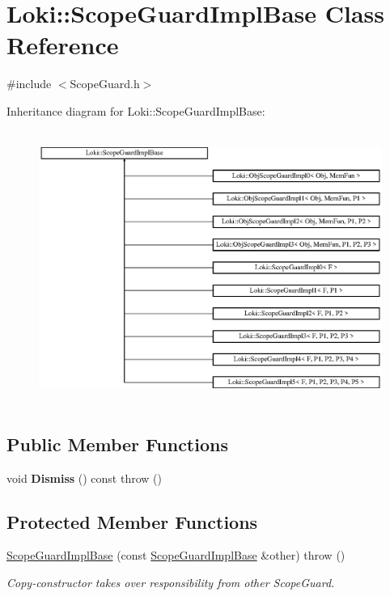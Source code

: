 \hypertarget{classLoki_1_1ScopeGuardImplBase}{}\section{Loki\+:\+:Scope\+Guard\+Impl\+Base Class Reference}
\label{classLoki_1_1ScopeGuardImplBase}


{\ttfamily \#include $<$Scope\+Guard.\+h$>$}

Inheritance diagram for Loki\+:\+:Scope\+Guard\+Impl\+Base\+:\begin{figure}[H]
\begin{center}
\leavevmode
\includegraphics[height=8.979592cm]{classLoki_1_1ScopeGuardImplBase}
\end{center}
\end{figure}
\subsection*{Public Member Functions}
\begin{DoxyCompactItemize}
\item 
\hypertarget{classLoki_1_1ScopeGuardImplBase_ac92171bf7798c8633ddb76e3b470dd90}{}void {\bfseries Dismiss} () const   throw ()\label{classLoki_1_1ScopeGuardImplBase_ac92171bf7798c8633ddb76e3b470dd90}

\end{DoxyCompactItemize}
\subsection*{Protected Member Functions}
\begin{DoxyCompactItemize}
\item 
\hypertarget{classLoki_1_1ScopeGuardImplBase_ad71436d97ac8d12c1057707c6b5472e5}{}\hyperlink{classLoki_1_1ScopeGuardImplBase_ad71436d97ac8d12c1057707c6b5472e5}{Scope\+Guard\+Impl\+Base} (const \hyperlink{classLoki_1_1ScopeGuardImplBase}{Scope\+Guard\+Impl\+Base} \&other)  throw ()\label{classLoki_1_1ScopeGuardImplBase_ad71436d97ac8d12c1057707c6b5472e5}

\begin{DoxyCompactList}\small\item\em Copy-\/constructor takes over responsibility from other Scope\+Guard. \end{DoxyCompactList}\end{DoxyCompactItemize}
